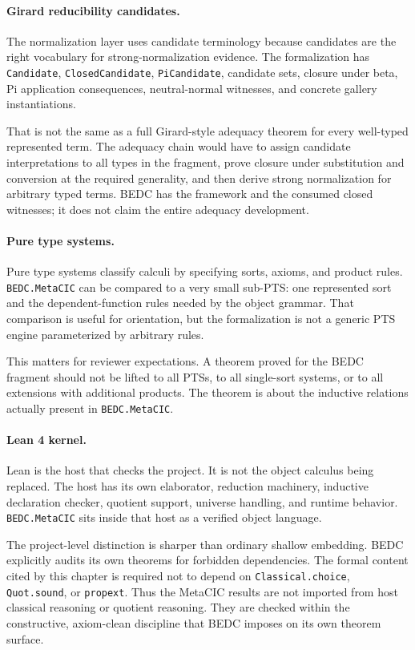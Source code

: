 \paragraph{Girard reducibility candidates.}
The normalization layer uses candidate terminology because candidates are the
right vocabulary for strong-normalization evidence.  The formalization has
\texttt{Candidate}, \texttt{ClosedCandidate}, \texttt{PiCandidate}, candidate
sets, closure under beta, Pi application consequences, neutral-normal
witnesses, and concrete gallery instantiations.

That is not the same as a full Girard-style adequacy theorem for every
well-typed represented term.  The adequacy chain would have to assign
candidate interpretations to all types in the fragment, prove closure under
substitution and conversion at the required generality, and then derive
strong normalization for arbitrary typed terms.  BEDC has the framework and
the consumed closed witnesses; it does not claim the entire adequacy
development.

\paragraph{Pure type systems.}
Pure type systems classify calculi by specifying sorts, axioms, and product
rules.  \texttt{BEDC.MetaCIC} can be compared to a very small sub-PTS: one
represented sort and the dependent-function rules needed by the object
grammar.  That comparison is useful for orientation, but the formalization is
not a generic PTS engine parameterized by arbitrary rules.

This matters for reviewer expectations.  A theorem proved for the BEDC
fragment should not be lifted to all PTSs, to all single-sort systems, or to
all extensions with additional products.  The theorem is about the inductive
relations actually present in \texttt{BEDC.MetaCIC}.

\paragraph{Lean 4 kernel.}
Lean is the host that checks the project.  It is not the object calculus being
replaced.  The host has its own elaborator, reduction machinery, inductive
declaration checker, quotient support, universe handling, and runtime
behavior.  \texttt{BEDC.MetaCIC} sits inside that host as a verified object
language.

The project-level distinction is sharper than ordinary shallow embedding.
BEDC explicitly audits its own theorems for forbidden dependencies.  The
formal content cited by this chapter is required not to depend on
\texttt{Classical.choice}, \texttt{Quot.sound}, or \texttt{propext}.  Thus
the MetaCIC results are not imported from host classical reasoning or quotient
reasoning.  They are checked within the constructive, axiom-clean discipline
that BEDC imposes on its own theorem surface.

